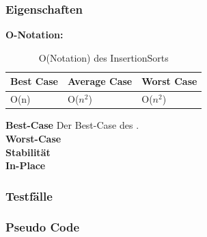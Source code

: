 \documentclass{article}
\begin{document}
\subsubsection{Eigenschaften}
\textbf{O-Notation:}
\begin{table}
\centering
\begin{tabular}{lll}
	\hline
	\textbf{Best Case} & \textbf{Average Case} & \textbf{Worst Case} \\
	\hline
	O(n) & O($n^{2}$) & O($n^{2}$) \\
	\hline
\end{tabular}
\caption{O(Notation) des InsertionSorts}
\label{tab:InsertioneSort}
\end{table}

\textbf{Best-Case} Der Best-Case des . \\
\textbf{Worst-Case} \\
\textbf{Stabilität}  \\

\textbf{In-Place}  \\
\subsubsection{Testfälle}



\subsubsection{Pseudo Code}
\end{document}
